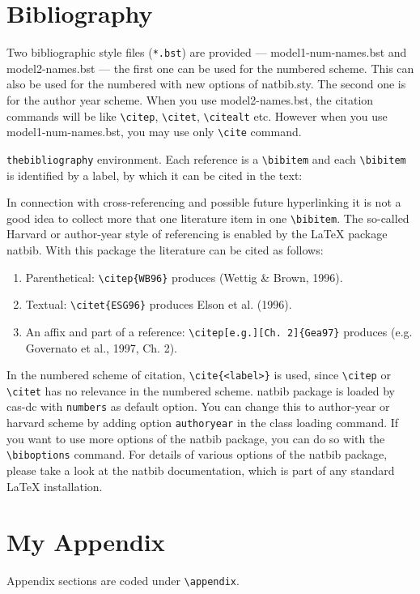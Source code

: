 \documentclass[a4paper,fleqn]{cas-dc}
\begin{document}
\section{Bibliography}

Two bibliographic style files (\verb+*.bst+) are provided ---
{model1-num-names.bst} and {model2-names.bst} --- the first one can be
used for the numbered scheme. This can also be used for the numbered
with new options of {natbib.sty}. The second one is for the author year
scheme. When  you use model2-names.bst, the citation commands will be
like \verb+\citep+,  \verb+\citet+, \verb+\citealt+ etc. However when
you use model1-num-names.bst, you may use only \verb+\cite+ command.

\verb+thebibliography+ environment.  Each reference is a\linebreak
\verb+\bibitem+ and each \verb+\bibitem+ is identified by a label,
by which it can be cited in the text:

\noindent In connection with cross-referencing and
possible future hyperlinking it is not a good idea to collect
more that one literature item in one \verb+\bibitem+.  The
so-called Harvard or author-year style of referencing is enabled
by the \LaTeX{} package {natbib}. With this package the
literature can be cited as follows:

\begin{enumerate}[(1)]
\item Parenthetical: \verb+\citep{WB96}+ produces (Wettig \& Brown, 1996).
\item Textual: \verb+\citet{ESG96}+ produces Elson et al. (1996).
\item An affix and part of a reference:\break
\verb+\citep[e.g.][Ch. 2]{Gea97}+ produces (e.g. Governato et
al., 1997, Ch. 2).
\end{enumerate}

In the numbered scheme of citation, \verb+\cite{<label>}+ is used,
since \verb+\citep+ or \verb+\citet+ has no relevance in the numbered
scheme.  {natbib} package is loaded by {cas-dc} with
\verb+numbers+ as default option.  You can change this to author-year
or harvard scheme by adding option \verb+authoryear+ in the class
loading command.  If you want to use more options of the {natbib}
package, you can do so with the \verb+\biboptions+ command.  For
details of various options of the {natbib} package, please take a
look at the {natbib} documentation, which is part of any standard
\LaTeX{} installation.

\appendix
\section{My Appendix}
Appendix sections are coded under \verb+\appendix+.
\end{document}
